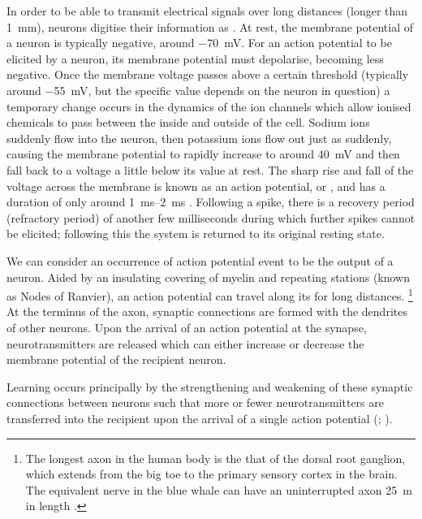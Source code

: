 In order to be able to transmit electrical signals over long distances (longer than \SI{1}{\milli\metre}), neurons digitise their information as .
At rest, the membrane potential of a neuron is typically negative, around \SI{-70}{\milli\volt}.
For an action potential to be elicited by a neuron, its membrane potential must depolarise, becoming less negative.
Once the membrane voltage passes above a certain threshold (typically around \SI{-55}{\milli\volt}, but the specific value depends on the neuron in question) a temporary change occurs in the dynamics of the ion channels which allow ionised chemicals to pass between the inside and outside of the cell.
Sodium ions suddenly flow into the neuron, then potassium ions flow out just as suddenly, causing the membrane potential to rapidly increase to around \SI{+40}{\milli\volt} and then fall back to a voltage a little below its value at rest.
The sharp rise and fall of the voltage across the membrane is known as an action potential, or , and has a duration of only around \SIrange{1}{2}{\milli\second} \citep[Chapter~1]{Dayan2001}.
Following a spike, there is a recovery period (refractory period) of another few milliseconds during which further spikes cannot be elicited; following this the system is returned to its original resting state.

We can consider an occurrence of action potential event to be the output of a neuron.
Aided by an insulating covering of myelin and repeating stations (known as Nodes of Ranvier), an action potential can travel along its  for long distances.%
\footnote{
The longest axon in the human body is the that of the dorsal root ganglion, which extends from the big toe to the primary sensory cortex in the brain.
The equivalent nerve in the blue whale can have an uninterrupted axon \SI{25}{\metre} in length \citep{Smith2009,Voytek2012}.
}
At the terminus of the axon, synaptic connections are formed with the dendrites of other neurons.
Upon the arrival of an action potential at the synapse, neurotransmitters are released which can either increase or decrease the membrane potential of the recipient neuron.

Learning occurs principally by the strengthening and weakening of these synaptic connections between neurons such that more or fewer neurotransmitters are transferred into the recipient upon the arrival of a single action potential (\citealp[Chapter~8]{Dayan2001}; \citealp[Chapter~23]{nsbook}).


